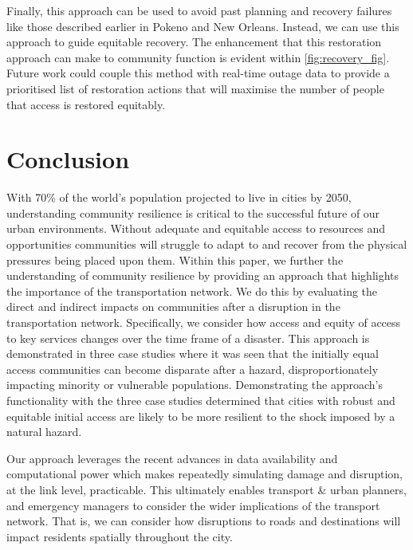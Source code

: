 \documentclass[review,3p,times,onecolumn,sort&compress,12pt]{elsarticle}
\begin{document}
Finally, this approach can be used to avoid past planning and recovery failures like those described earlier in Pokeno and New Orleans.
Instead, we can use this approach to guide equitable recovery.
The enhancement that this restoration approach can make to community function is evident within \autoref{fig:recovery_fig}.
Future work could couple this method with real-time outage data to provide a prioritised list of restoration actions that will maximise the number of people that access is restored equitably.



\section{Conclusion}
With 70\% of the world's population projected to live in cities by 2050, understanding community resilience is critical to the successful future of our urban environments.
Without adequate and equitable access to resources and opportunities communities will struggle to adapt to and recover from the physical pressures being placed upon them.
Within this paper, we further the understanding of community resilience by providing an approach that highlights the importance of the transportation network.
We do this by evaluating the direct and indirect impacts on communities after a disruption in the transportation network.
Specifically, we consider how access and equity of access to key services changes over the time frame of a disaster.
This approach is demonstrated in three case studies where it was seen that the initially equal access communities can become disparate after a hazard, disproportionately impacting minority or vulnerable populations.
Demonstrating the approach’s functionality with the three case studies determined that cities with robust and equitable initial access are likely to be more resilient to the shock imposed by a natural hazard. 

Our approach leverages the recent advances in data availability and computational power which makes repeatedly simulating damage and disruption, at the link level, practicable.
This ultimately enables transport \& urban planners, and emergency managers to consider the wider implications of the transport network.
That is, we can consider how disruptions to roads and destinations will impact residents spatially throughout the city.
\end{document}
